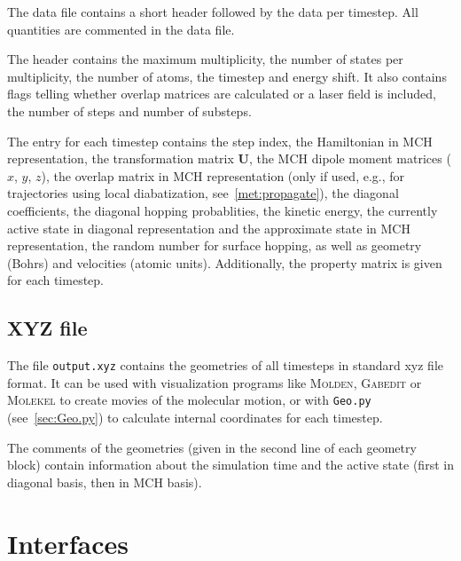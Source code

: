 \documentclass[a4paper,11pt,DIV=15,openany,twoside=false]{scrbook}
\newcommand{\ttt}[1]{\texttt{#1}}
\renewcommand{\vec}[1]{\ensuremath{\mathbf{#1}}}
\begin{document}
The data file contains a short header followed by the data per timestep. All quantities are commented in the data file.

The header contains the maximum multiplicity, the number of states per multiplicity, the number of atoms, the timestep and energy shift. It also contains flags telling whether overlap matrices are calculated or a laser field is included, the number of steps and number of substeps.

The entry for each timestep contains the step index, the Hamiltonian in MCH representation, the transformation matrix $\vec{U}$, the MCH dipole moment matrices ($x$, $y$, $z$), the overlap matrix in MCH representation (only if used, e.g., for trajectories using local diabatization, see~\ref{met:propagate}), the diagonal coefficients, the diagonal hopping probablities, the kinetic energy, the currently active state in diagonal representation and the approximate state in MCH representation, the random number for surface hopping, as well as geometry (Bohrs) and velocities (atomic units). Additionally, the property matrix is given for each timestep.

\section{XYZ file}\label{sec:xyzfile}

The file \ttt{output.xyz} contains the geometries of all timesteps in standard xyz file format. It can be used with visualization programs like \textsc{Molden}, \textsc{Gabedit} or \textsc{Molekel} to create movies of the molecular motion, or with \ttt{Geo.py} (see~\ref{sec:Geo.py}) to calculate internal coordinates for each timestep.

The comments of the geometries (given in the second line of each geometry block) contain information about the simulation time and the active state (first in diagonal basis, then in MCH basis).



\chapter{Interfaces}\label{chap:interfaces}
\end{document}
